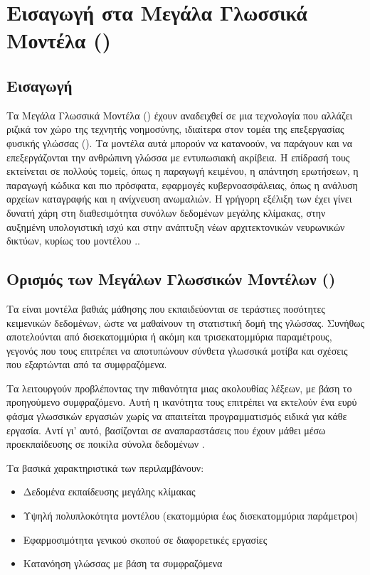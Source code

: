 \section{Εισαγωγή στα Μεγάλα Γλωσσικά Μοντέλα ()}

\subsection{Εισαγωγή}

Τα Μεγάλα Γλωσσικά Μοντέλα () έχουν αναδειχθεί σε μια τεχνολογία που αλλάζει ριζικά τον χώρο της τεχνητής νοημοσύνης, ιδιαίτερα στον τομέα της επεξεργασίας φυσικής γλώσσας (). Τα μοντέλα αυτά μπορούν να κατανοούν, να παράγουν και να επεξεργάζονται την ανθρώπινη γλώσσα με εντυπωσιακή ακρίβεια. Η επίδρασή τους εκτείνεται σε πολλούς τομείς, όπως η παραγωγή κειμένου, η απάντηση ερωτήσεων, η παραγωγή κώδικα και πιο πρόσφατα, εφαρμογές κυβερνοασφάλειας, όπως η ανάλυση αρχείων καταγραφής και η ανίχνευση ανωμαλιών. Η γρήγορη εξέλιξη των  έχει γίνει δυνατή χάρη στη διαθεσιμότητα συνόλων δεδομένων μεγάλης κλίμακας, στην αυξημένη υπολογιστική ισχύ και στην ανάπτυξη νέων αρχιτεκτονικών νευρωνικών δικτύων, κυρίως του μοντέλου  \cite{vaswani2017attention}..

\subsection{Ορισμός των Μεγάλων Γλωσσικών Μοντέλων ()}

Τα  είναι μοντέλα βαθιάς μάθησης που εκπαιδεύονται σε τεράστιες ποσότητες κειμενικών δεδομένων, ώστε να μαθαίνουν τη στατιστική δομή της γλώσσας. Συνήθως αποτελούνται από δισεκατομμύρια ή ακόμη και τρισεκατομμύρια παραμέτρους, γεγονός που τους επιτρέπει να αποτυπώνουν σύνθετα γλωσσικά μοτίβα και σχέσεις που εξαρτώνται από τα συμφραζόμενα.

Τα  λειτουργούν προβλέποντας την πιθανότητα μιας ακολουθίας λέξεων, με βάση το προηγούμενο συμφραζόμενο. Αυτή η ικανότητα τους επιτρέπει να εκτελούν ένα ευρύ φάσμα γλωσσικών εργασιών χωρίς να απαιτείται προγραμματισμός ειδικά για κάθε εργασία. Αντί γι’ αυτό, βασίζονται σε αναπαραστάσεις που έχουν μάθει μέσω προεκπαίδευσης σε ποικίλα σύνολα δεδομένων \cite{brown2020language}.

Τα βασικά χαρακτηριστικά των  περιλαμβάνουν:
\begin{itemize}
\item Δεδομένα εκπαίδευσης μεγάλης κλίμακας
\item Υψηλή πολυπλοκότητα μοντέλου (εκατομμύρια έως δισεκατομμύρια παράμετροι)
\item Εφαρμοσιμότητα γενικού σκοπού σε διαφορετικές εργασίες
\item Κατανόηση γλώσσας με βάση τα συμφραζόμενα
\end{itemize}

